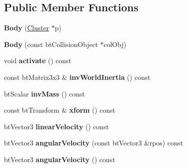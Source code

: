 \subsection*{Public Member Functions}
\begin{DoxyCompactItemize}
\item 
\mbox{\label{structbtSoftBody_1_1Body_a0b287c295eaf49e1df203af5cfec21e4}} 
{\bfseries Body} (\hyperlink{structbtSoftBody_1_1Cluster}{Cluster} $\ast$p)
\item 
\mbox{\label{structbtSoftBody_1_1Body_a7446fb5002adb460ab6a7f7bc2054a33}} 
{\bfseries Body} (const bt\+Collision\+Object $\ast$col\+Obj)
\item 
\mbox{\label{structbtSoftBody_1_1Body_a9e70e673227f7ef73a4e8ccc7c560c60}} 
void {\bfseries activate} () const
\item 
\mbox{\label{structbtSoftBody_1_1Body_a9252089411f944d56a34a29f8dfe6439}} 
const bt\+Matrix3x3 \& {\bfseries inv\+World\+Inertia} () const
\item 
\mbox{\label{structbtSoftBody_1_1Body_a0043e0e775b30378a32a9f24b5e9a996}} 
bt\+Scalar {\bfseries inv\+Mass} () const
\item 
\mbox{\label{structbtSoftBody_1_1Body_a313ac03412ec7f24625eec2733a1c45e}} 
const bt\+Transform \& {\bfseries xform} () const
\item 
\mbox{\label{structbtSoftBody_1_1Body_a3ee8477b06e40dd7d269871fcb1ee18d}} 
bt\+Vector3 {\bfseries linear\+Velocity} () const
\item 
\mbox{\label{structbtSoftBody_1_1Body_a65191d8f114f7345f5341b9a118c294f}} 
bt\+Vector3 {\bfseries angular\+Velocity} (const bt\+Vector3 \&rpos) const
\item 
\mbox{\label{structbtSoftBody_1_1Body_a305479bdd38b8ff76e4df7e75116daee}} 
bt\+Vector3 {\bfseries angular\+Velocity} () const
\item 
\mbox{\label{structbtSoftBody_1_1Body_a7cd6b38f2ae71df768bc023b5f12bdaa}} 

\end{DoxyCompactItemize}
